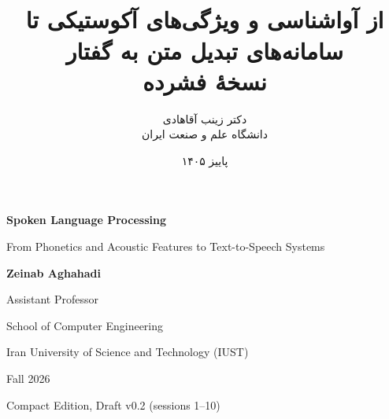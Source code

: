 \documentclass[12pt,a4paper]{book}
\title{{\titlefont\Huge \course}\\[0.5em]
{\Large از آواشناسی و ویژگی‌های آکوستیکی تا سامانه‌های تبدیل متن به گفتار}\\[0.6em]
{\large نسخهٔ فشرده}}
\author{دکتر زینب آقاهادی\\[0.4em]
دانشگاه علم و صنعت ایران}
\date{پاییز ۱۴۰۵}
\begin{document}
\raggedbottom
\frontmatter
\maketitle

\begingroup
\thispagestyle{empty}
\begin{latin}
\centering
\vspace*{0.16\textheight}
{\Huge\bfseries Spoken Language Processing\par}
\vspace{3em}
{\Large From Phonetics and Acoustic Features to Text-to-Speech Systems\par}
\vfill
{\Large\bfseries Zeinab Aghahadi\par}
\vspace{1.2em}
{\large Assistant Professor\par}
{\large School of Computer Engineering\par}
{\large Iran University of Science and Technology (IUST)\par}
\vfill
{\large Fall 2026\par}
\vspace{0.5em}
{\large Compact Edition, Draft v0.2 (sessions 1--10)\par}
\end{latin}
\clearpage
\endgroup



\tableofcontents

\mainmatter











\end{document}
